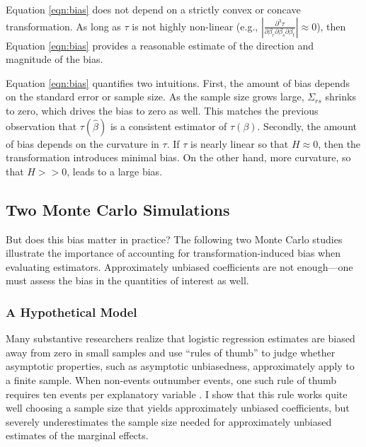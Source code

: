 \documentclass[12pt]{article}
\begin{document}
Equation \ref{eqn:bias} does not depend on a strictly convex or concave transformation. 
As long as $\tau$ is not highly non-linear (e.g., $\left|\frac{\partial^3 \tau}{\partial \beta_r \partial \beta_s \partial \beta_t}\right| \approx 0$), then Equation \ref{eqn:bias} provides a reasonable estimate of the direction and magnitude of the bias.

Equation \ref{eqn:bias} quantifies two intuitions. 
First, the amount of bias depends on the standard error or sample size. 
As the sample size grows large, $\Sigma_{rs}$ shrinks to zero, which drives the bias to zero as well. 
This matches the previous observation that $\tau(\hat{\beta})$ is a consistent estimator of $\tau(\beta)$. 
Secondly, the amount of bias depends on the curvature in $\tau$. 
If $\tau$ is nearly linear so that $H \approx 0$, then the transformation introduces minimal bias. 
On the other hand, more curvature, so that $H >> 0$, leads to a large bias. 

\subsection*{Two Monte Carlo Simulations}

But does this bias matter in practice? The following two Monte Carlo studies illustrate the importance of accounting for transformation-induced bias when evaluating estimators. 
Approximately unbiased coefficients are not enough---one must assess the bias in the quantities of interest as well. 

\subsubsection*{A Hypothetical Model}

Many substantive researchers realize that logistic regression estimates are biased away from zero in small samples and use ``rules of thumb'' to judge whether asymptotic properties, such as asymptotic unbiasedness, approximately apply to a finite sample.
When non-events outnumber events, one such rule of thumb requires ten events per explanatory variable \citep{Peduzzietal1996}.
I show that this rule works quite well choosing a sample size that yields approximately unbiased coefficients, but severely underestimates the sample size needed for approximately unbiased estimates of the marginal effects.
\end{document}
